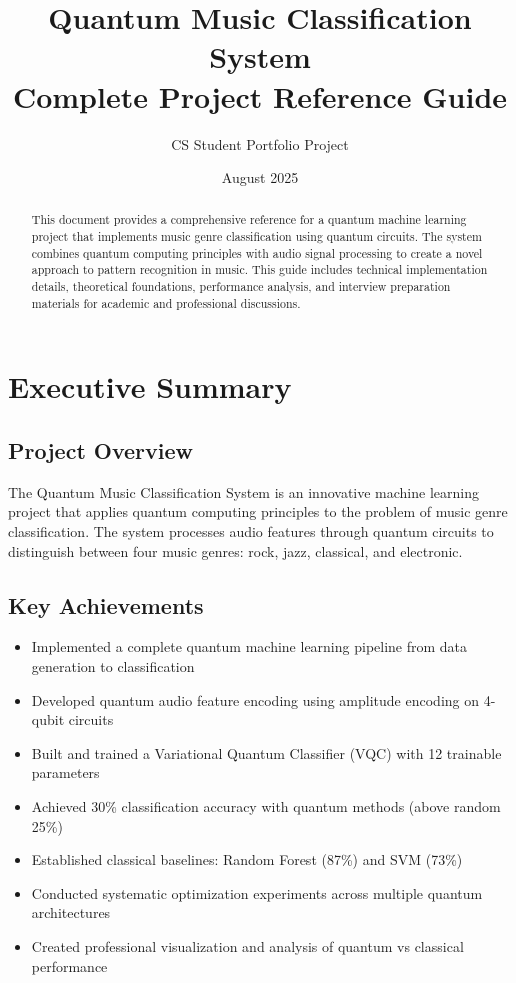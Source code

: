 \documentclass[11pt,a4paper]{article}
\title{\textbf{Quantum Music Classification System}\\
\large Complete Project Reference Guide}
\author{CS Student Portfolio Project}
\date{August 2025}
\begin{document}
\maketitle

\begin{abstract}
This document provides a comprehensive reference for a quantum machine learning project that implements music genre classification using quantum circuits. The system combines quantum computing principles with audio signal processing to create a novel approach to pattern recognition in music. This guide includes technical implementation details, theoretical foundations, performance analysis, and interview preparation materials for academic and professional discussions.
\end{abstract}

\tableofcontents
\newpage

\section{Executive Summary}

\subsection{Project Overview}
The Quantum Music Classification System is an innovative machine learning project that applies quantum computing principles to the problem of music genre classification. The system processes audio features through quantum circuits to distinguish between four music genres: rock, jazz, classical, and electronic.

\subsection{Key Achievements}
\begin{itemize}
    \item Implemented a complete quantum machine learning pipeline from data generation to classification
    \item Developed quantum audio feature encoding using amplitude encoding on 4-qubit circuits
    \item Built and trained a Variational Quantum Classifier (VQC) with 12 trainable parameters
    \item Achieved 30\% classification accuracy with quantum methods (above random 25\%)
    \item Established classical baselines: Random Forest (87\%) and SVM (73\%)
    \item Conducted systematic optimization experiments across multiple quantum architectures
    \item Created professional visualization and analysis of quantum vs classical performance
\end{itemize}
\end{document}
